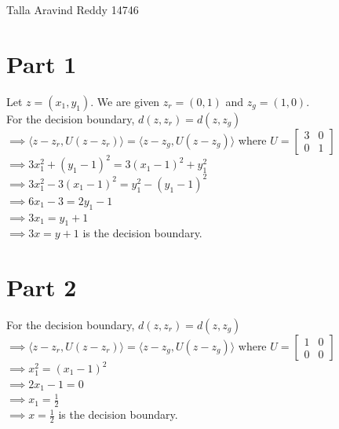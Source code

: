 \documentclass[a4paper,11pt]{article}
\begin{document}
								{Talla Aravind Reddy}      						           		%
								{14746}																		%

\begin{mlsolution}

\section*{Part 1}
Let $z=(x_1,y_1)$. We are given ${z_r}=(0,1)$ and ${z_g}=(1,0)$.
\\For the decision boundary, $d(z,z_r) = d(z,z_g)$ 
\\$\implies \langle z-z_r,U(z-z_r)\rangle = \langle z-z_g,U(z-z_g)\rangle $ 
where $U = \begin{bmatrix} 3 & 0  \\ 0 & 1 \end{bmatrix}$
\\$\implies 3x_1^2 + (y_1 - 1)^2 = 3(x_1 - 1)^2 + y_1^2 $
\\$\implies 3x_1^2 - 3(x_1 - 1)^2 =  y_1^2 - (y_1 - 1)^2$
\\$\implies 6x_1- 3 =  2y_1 - 1$
\\$\implies 3x_1 = y_1 + 1$
\\$\implies 3x = y+ 1$ is the decision boundary.

\section*{Part 2}
For the decision boundary, $d(z,z_r) = d(z,z_g)$ 
\\$\implies \langle z-z_r,U(z-z_r)\rangle = \langle z-z_g,U(z-z_g)\rangle $ 
where $U = \begin{bmatrix} 1 & 0  \\ 0 & 0 \end{bmatrix}$
\\$\implies x_1^2 = (x_1 - 1)^2$
\\$\implies 2x_1 - 1 =  0$
\\$\implies x_1 = \frac{1}{2}$
\\$\implies x = \frac{1}{2}$ is the decision boundary.


\end{mlsolution}
\end{document}
